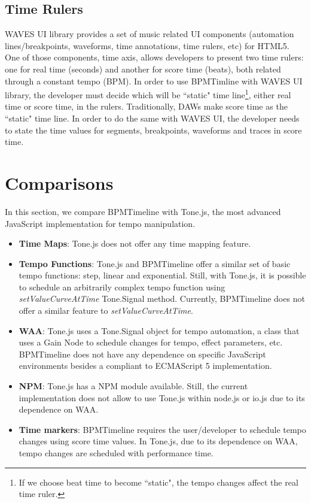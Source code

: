 \documentclass{sig-alternate}
\begin{document}
\subsection{Time Rulers}
WAVES UI library \cite{wavesui:wac2015} provides a set of music related UI components (automation lines/breakpoints, waveforms, time annotations, time rulers, etc) for HTML5. One of those components, time axis, allows developers to present two time rulers: one for real time (seconds) and another for score time (beats), both related through a constant tempo (BPM). In order to use BPMTimline with WAVES UI library, the developer must decide which will be ``static" time line\footnote{If we choose beat time to become ``static", the tempo changes affect the real time ruler.}, either real time or score time, in the rulers. Traditionally, DAWs make score time as the ``static" time line. In order to do the same with WAVES UI, the developer needs to state the time values for segments, breakpoints, waveforms and traces in score time.

\section{Comparisons}
\begin{sloppypar}
In this section, we compare BPMTimeline with Tone.js, the most advanced JavaScript implementation for tempo manipulation.
\begin{itemize}
	\item \textbf{Time Maps}: Tone.js does not offer any time mapping feature.
	\item \textbf{Tempo Functions}: Tone.js and BPMTimeline offer a similar set of basic tempo functions: step, linear and exponential. Still, with Tone.js, it is possible to schedule an arbitrarily complex tempo function using \textit{setValueCurveAtTime} Tone.Signal method. Currently, BPMTimeline does not offer a similar feature to \textit{setValueCurveAtTime}.
	\item \textbf{WAA}: Tone.js uses a Tone.Signal object for tempo automation, a class that uses a Gain Node to schedule changes for tempo, effect parameters, etc. BPMTimeline does not have any dependence on specific JavaScript environments besides a compliant to ECMAScript 5 implementation.
	\item \textbf{NPM}: Tone.js has a NPM module available. Still, the current implementation does not allow to use Tone.js within node.js or io.js due to its dependence on WAA.
	\item \textbf{Time markers}: BPMTimeline requires the user/developer to schedule tempo changes using score time values. In Tone.js, due to its dependence on WAA, tempo changes are scheduled with performance time.
\end{itemize}
\end{sloppypar}
\end{document}

